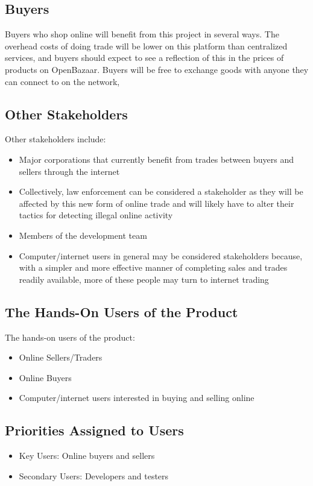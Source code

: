 \documentclass{article}
\begin{document}
\subsection{Buyers}
Buyers who shop online will benefit from this project in several ways. The overhead costs of doing trade will be lower on this platform than centralized services, and buyers should expect to see a reflection of this in the prices of products on OpenBazaar. Buyers will be free to exchange goods with anyone they can connect to on the network, 

\subsection{Other Stakeholders}
Other stakeholders include:

\begin{itemize}
\item
Major corporations that currently benefit from trades between buyers and sellers through the internet

\item
Collectively, law enforcement can be considered a stakeholder as they will be affected by this new form of online trade and will likely have to alter their tactics for detecting illegal online activity

\item
Members of the development team

\item
Computer/internet users in general may be considered stakeholders because, with a simpler and more effective manner of completing sales and trades readily available, more of these people may turn to internet trading
\end{itemize}


\subsection{The Hands-On Users of the Product}
The hands-on users of the product:
\begin{itemize}
\item
Online Sellers/Traders

\item
Online Buyers

\item
Computer/internet users interested in buying and selling online
\end{itemize}

\subsection{Priorities Assigned to Users}
\begin{itemize}
\item
Key Users: Online buyers and sellers

\item
Secondary Users: Developers and testers
\end{itemize}
\end{document}
